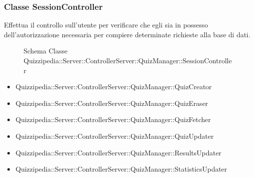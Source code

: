 \subsubsection{Classe SessionController}
Effettua il controllo sull'utente per verificare che egli sia in possesso dell'autorizzazione necessaria per compiere determinate richieste alla base di dati.
\begin{figure}[H]
\centering
\noindent{}
\caption[Schema Classe SessionController]{Schema Classe Quizzipedia::Server::ControllerServer::QuizManager::SessionController}
\end{figure}
\begin{itemize}
\item Quizzipedia::Server::ControllerServer::QuizManager::QuizCreator
\item Quizzipedia::Server::ControllerServer::QuizManager::QuizEraser
\item Quizzipedia::Server::ControllerServer::QuizManager::QuizFetcher
\item Quizzipedia::Server::ControllerServer::QuizManager::QuizUpdater
\item Quizzipedia::Server::ControllerServer::QuizManager::ResultsUpdater
\item Quizzipedia::Server::ControllerServer::QuizManager::StatisticsUpdater
\end{itemize}
